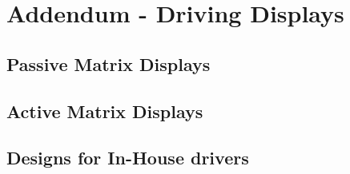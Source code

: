 \section{Addendum - Driving Displays}
\subsection{Passive Matrix Displays}
\subsection{Active Matrix Displays}
\subsection{Designs for In-House drivers}